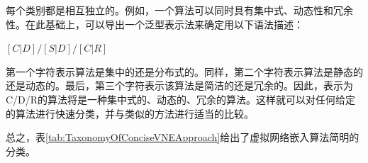 每个类别都是相互独立的。例如，一个算法可以同时具有集中式、动态性和冗余性。在此基础上，可以导出一个泛型表示法来确定用以下语法描述：

\begin{center}
  $[C|D]/[S|D]/[C|R]$
\end{center}

第一个字符表示算法是集中的还是分布式的。同样，第二个字符表示算法是静态的还是动态的。最后，第三个字符表示该算法是简洁的还是冗余的。因此，表示为C/D/R的算法将是一种集中式的、动态的、冗余的算法。这样就可以对任何给定的算法进行快速分类，并与类似的方法进行适当的比较。

总之，表\ref{tab:TaxonomyOfConciseVNEApproach}给出了虚拟网络嵌入算法简明的分类。
\renewcommand\arraystretch{1.0}
\wuhao

